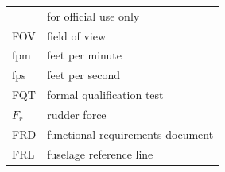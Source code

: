 \documentclass[
]{book}
\begin{document}
\begin{longtable}[]{@{}ll@{}}
\begin{minipage}[t]{0.47\columnwidth}
\end{minipage} & \begin{minipage}[t]{0.47\columnwidth}\raggedright
for official use only\strut
\end{minipage}\tabularnewline
\begin{minipage}[t]{0.47\columnwidth}\raggedright
FOV\strut
\end{minipage} & \begin{minipage}[t]{0.47\columnwidth}\raggedright
field of view\strut
\end{minipage}\tabularnewline
\begin{minipage}[t]{0.47\columnwidth}\raggedright
fpm\strut
\end{minipage} & \begin{minipage}[t]{0.47\columnwidth}\raggedright
feet per minute\strut
\end{minipage}\tabularnewline
\begin{minipage}[t]{0.47\columnwidth}\raggedright
fps\strut
\end{minipage} & \begin{minipage}[t]{0.47\columnwidth}\raggedright
feet per second\strut
\end{minipage}\tabularnewline
\begin{minipage}[t]{0.47\columnwidth}\raggedright
FQT\strut
\end{minipage} & \begin{minipage}[t]{0.47\columnwidth}\raggedright
formal qualification test\strut
\end{minipage}\tabularnewline
\begin{minipage}[t]{0.47\columnwidth}\raggedright
\(F_r\)\strut
\end{minipage} & \begin{minipage}[t]{0.47\columnwidth}\raggedright
rudder force\strut
\end{minipage}\tabularnewline
\begin{minipage}[t]{0.47\columnwidth}\raggedright
FRD\strut
\end{minipage} & \begin{minipage}[t]{0.47\columnwidth}\raggedright
functional requirements document\strut
\end{minipage}\tabularnewline
\begin{minipage}[t]{0.47\columnwidth}\raggedright
FRL\strut
\end{minipage} & \begin{minipage}[t]{0.47\columnwidth}\raggedright
fuselage reference line\strut
\end{minipage}\tabularnewline

\end{longtable}
\end{document}
